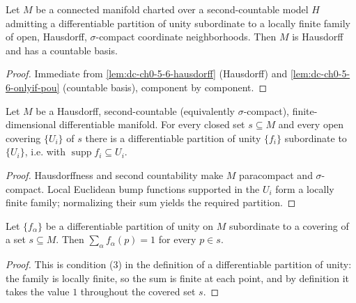 \begin{lemma}
  \label{lem:dc-ch0-5-6-onlyif-complete}
  \leanok
  Let $M$ be a connected manifold charted over a second-countable model $H$ admitting a
  differentiable partition of unity subordinate to a locally finite family of open,
  Hausdorff, $\sigma$-compact coordinate neighborhoods. Then $M$ is Hausdorff and has a
  countable basis.
\end{lemma}
\begin{proof}
  \sketch
  \leanok
  Immediate from \cref{lem:dc-ch0-5-6-hausdorff} (Hausdorff) and
  \cref{lem:dc-ch0-5-6-onlyif-pou} (countable basis), component by component.
\end{proof}

\begin{lemma}
  \label{lem:dc-ch0-5-6-exists}
  \leanok
  Let $M$ be a Hausdorff, second-countable (equivalently $\sigma$-compact),
  finite-dimensional differentiable manifold. For every closed set $s\subseteq M$
  and every open covering $\{U_i\}$ of $s$ there is a differentiable partition of
  unity $\{f_i\}$ subordinate to $\{U_i\}$, i.e. with
  $\operatorname{supp} f_i\subseteq U_i$.
\end{lemma}
\begin{proof}
  \sketch
  \leanok
  Hausdorffness and second countability make $M$ paracompact and $\sigma$-compact.
  Local Euclidean bump functions supported in the $U_i$ form a locally finite family;
  normalizing their sum yields the required partition.
\end{proof}

\begin{lemma}
  \label{lem:dc-ch0-5-6-sum}
  \leanok
  Let $\{f_\alpha\}$ be a differentiable partition of unity on $M$ subordinate to a
  covering of a set $s\subseteq M$. Then $\sum_\alpha f_\alpha(p)=1$ for every
  $p\in s$.
\end{lemma}
\begin{proof}
  \sketch
  \leanok
  This is condition (3) in the definition of a differentiable partition of unity:
  the family is locally finite, so the sum is finite at each point, and by
  definition it takes the value $1$ throughout the covered set $s$.
\end{proof}


